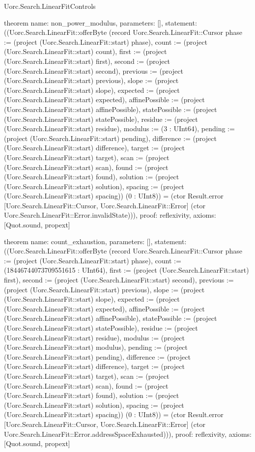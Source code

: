 \begin{lexlean}{Uorc.Search.LinearFitControls}
\begin{semanticmodule}
theorem{
  name: non_power_modulus,
  parameters: [],
  statement: ((Uorc.Search.LinearFit::offerByte (record Uorc.Search.LinearFit::Cursor {phase := (project (Uorc.Search.LinearFit::start) phase), count := (project (Uorc.Search.LinearFit::start) count), first := (project (Uorc.Search.LinearFit::start) first), second := (project (Uorc.Search.LinearFit::start) second), previous := (project (Uorc.Search.LinearFit::start) previous), slope := (project (Uorc.Search.LinearFit::start) slope), expected := (project (Uorc.Search.LinearFit::start) expected), affinePossible := (project (Uorc.Search.LinearFit::start) affinePossible), statePossible := (project (Uorc.Search.LinearFit::start) statePossible), residue := (project (Uorc.Search.LinearFit::start) residue), modulus := (3 : UInt64), pending := (project (Uorc.Search.LinearFit::start) pending), difference := (project (Uorc.Search.LinearFit::start) difference), target := (project (Uorc.Search.LinearFit::start) target), scan := (project (Uorc.Search.LinearFit::start) scan), found := (project (Uorc.Search.LinearFit::start) found), solution := (project (Uorc.Search.LinearFit::start) solution), spacing := (project (Uorc.Search.LinearFit::start) spacing)}) (0 : UInt8)) = (ctor Result.error [Uorc.Search.LinearFit::Cursor, Uorc.Search.LinearFit::Error] (ctor Uorc.Search.LinearFit::Error.invalidState))),
  proof: reflexivity{},
  axioms: [Quot.sound, propext]
}

theorem{
  name: count_exhaustion,
  parameters: [],
  statement: ((Uorc.Search.LinearFit::offerByte (record Uorc.Search.LinearFit::Cursor {phase := (project (Uorc.Search.LinearFit::start) phase), count := (18446744073709551615 : UInt64), first := (project (Uorc.Search.LinearFit::start) first), second := (project (Uorc.Search.LinearFit::start) second), previous := (project (Uorc.Search.LinearFit::start) previous), slope := (project (Uorc.Search.LinearFit::start) slope), expected := (project (Uorc.Search.LinearFit::start) expected), affinePossible := (project (Uorc.Search.LinearFit::start) affinePossible), statePossible := (project (Uorc.Search.LinearFit::start) statePossible), residue := (project (Uorc.Search.LinearFit::start) residue), modulus := (project (Uorc.Search.LinearFit::start) modulus), pending := (project (Uorc.Search.LinearFit::start) pending), difference := (project (Uorc.Search.LinearFit::start) difference), target := (project (Uorc.Search.LinearFit::start) target), scan := (project (Uorc.Search.LinearFit::start) scan), found := (project (Uorc.Search.LinearFit::start) found), solution := (project (Uorc.Search.LinearFit::start) solution), spacing := (project (Uorc.Search.LinearFit::start) spacing)}) (0 : UInt8)) = (ctor Result.error [Uorc.Search.LinearFit::Cursor, Uorc.Search.LinearFit::Error] (ctor Uorc.Search.LinearFit::Error.addressSpaceExhausted))),
  proof: reflexivity{},
  axioms: [Quot.sound, propext]
}


\end{semanticmodule}
\end{lexlean}
